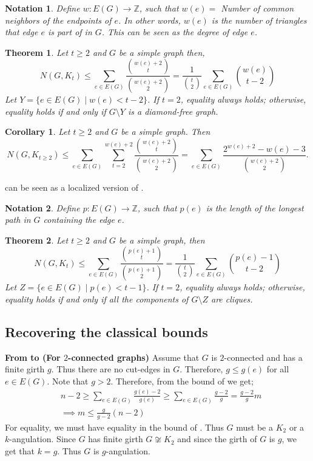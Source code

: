 \documentclass[pdflatex,sn-basic,Numbered]{sn-jnl}
\newtheorem{theorem}{Theorem}
\newtheorem{corollary}{Corollary}
\newtheorem{notation}{Notation}
\begin{document}
\begin{notation}
    Define $w: E(G) \rightarrow \mathbb{Z}$, such that $w(e)=$ Number of common neighbors of the endpoints of $e$. In other words, $w(e)$ is the number of triangles that edge $e$ is part of in $G$.  This can be seen as the \textit{degree} of edge $e$.
\end{notation}
\begin{theorem}\label{thm1}
    Let $t\geq 2$ and $G$ be a simple graph then,
    \[N(G,K_t) \leq \sum_{e\in E(G)} \frac{{w(e) +2 \choose t}}{{w(e)+2 \choose 2}} = \frac{1}{{t\choose 2}}\sum_{e \in E(G)}{w(e)\choose t-2}\]
    Let $Y = \{e \in E(G)\mid w(e) < t-2\}$. If $t =2$, equality always holds; otherwise, equality holds if and only if $G\setminus Y$ is a diamond-free graph.
\end{theorem}
\begin{corollary}\label{woodcor2}
    Let $t \geq 2$ and $G$ be a simple graph. Then  
    \[
        N(G,K_{t \geq 2}) \leq \sum_{e\in E(G)} \sum_{t =2}^{w(e)+2}\frac{{w(e)+2\choose t}}{{w(e)+2\choose 2}} 
        = \sum_{e \in E(G)}\frac{2^{w(e)+2} - w(e) -3}{{w(e) +2\choose 2}}.
    \]
\end{corollary}
 can be seen as a localized version of .

\begin{notation}
    Define $p: E(G) \rightarrow \mathbb{Z}$, such that $p(e)$ is the length of the longest path in $G$ containing the edge $e$.
\end{notation}
\begin{theorem}\label{thm3}
    Let $t \geq 2$ and $G$ be a simple graph, then
    \[ N(G,K_t) \leq \sum_{e \in E(G)} \frac{{p(e) +1 \choose t}}{{p(e) +1 \choose 2}} = \frac{1}{{t\choose 2}}\sum_{e\in E(G)}{p(e)-1\choose t-2}\]
    Let $Z = \{e \in E(G)\mid p(e) < t-1\}$. If $t =2$, equality always holds; otherwise, equality holds if and only if all the components of $G \setminus Z$ are cliques.
\end{theorem}
\subsection{Recovering the classical bounds}

\noindent \textbf{From  to  (For $2$-connected graphs)}
\newline Assume that $G$ is $2$-connected and has a finite girth $g$. Thus there are no cut-edges in $G$. Therefore, $g \leq g(e)$ for all $e \in E(G)$. Note that $g >2$. Therefore, from the bound of  we get;
\begin{align*}
    &n-2 \geq \sum_{e\in E(G)}\frac{g(e)-2}{g(e)} \geq \sum_{e\in E(G)}\frac{g-2}{g} = \frac{g-2}{g}m\\
    &\implies  m \leq \frac{g}{g-2}(n-2)
\end{align*}
For equality, we must have equality in the bound of . Thus $G$ must be a $K_2$ or a $k$-angulation. Since $G$ has finite girth $G \not\cong K_2$ and since the girth of $G$ is $g$, we get that $k = g$. Thus $G$ is $g$-angulation.
\end{document}
